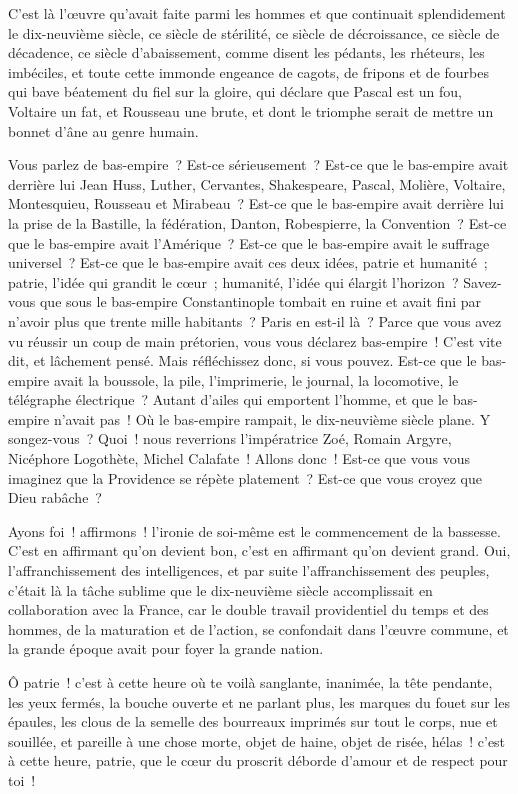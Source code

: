 \documentclass[french,twoside]{book} %
\begin{document}
C’est là l’œuvre qu’avait faite parmi les hommes et que continuait splendidement le dix-neuvième siècle, ce siècle de stérilité, ce siècle de décroissance, ce siècle de décadence, ce siècle d’abaissement, comme disent les pédants, les rhéteurs, les imbéciles, et toute cette immonde engeance de cagots, de fripons et de fourbes qui bave béatement du fiel sur la gloire, qui déclare que Pascal est un fou, Voltaire un fat, et Rousseau une brute, et dont le triomphe serait de mettre un bonnet d’âne au genre humain.\par
Vous parlez de bas-empire ? Est-ce sérieusement ? Est-ce que le bas-empire avait derrière lui Jean Huss, Luther, Cervantes, Shakespeare, Pascal, Molière, Voltaire, Montesquieu, Rousseau et Mirabeau ? Est-ce que le bas-empire avait derrière lui la prise de la Bastille, la fédération, Danton, Robespierre, la Convention ? Est-ce que le bas-empire avait l’Amérique ? Est-ce que le bas-empire avait le suffrage universel ? Est-ce que le bas-empire avait ces deux idées, patrie et humanité ; patrie, l’idée qui grandit le cœur ; humanité, l’idée qui élargit l’horizon ? Savez-vous que sous le bas-empire Constantinople tombait en ruine et avait fini par n’avoir plus que trente mille habitants ? Paris en est-il là ? Parce que vous avez vu réussir un coup de main prétorien, vous vous déclarez bas-empire ! C’est vite dit, et lâchement pensé. Mais réfléchissez donc, si vous pouvez. Est-ce que le bas-empire avait la boussole, la pile, l’imprimerie, le journal, la locomotive, le télégraphe électrique ? Autant d’ailes qui emportent l’homme, et que le bas-empire n’avait pas ! Où le bas-empire rampait, le dix-neuvième siècle plane. Y songez-vous ? Quoi ! nous reverrions l’impératrice Zoé, Romain Argyre, Nicéphore Logothète, Michel Calafate ! Allons donc ! Est-ce que vous vous imaginez que la Providence se répète platement ? Est-ce que vous croyez que Dieu rabâche ?\par
Ayons foi ! affirmons ! l’ironie de soi-même est le commencement de la bassesse. C’est en affirmant qu’on devient bon, c’est en affirmant qu’on devient grand. Oui, l’affranchissement des intelligences, et par suite l’affranchissement des peuples, c’était là la tâche sublime que le dix-neuvième siècle accomplissait en collaboration avec la France, car le double travail providentiel du temps et des hommes, de la maturation et de l’action, se confondait dans l’œuvre commune, et la grande époque avait pour foyer la grande nation.\par
Ô patrie ! c’est à cette heure où te voilà sanglante, inanimée, la tête pendante, les yeux fermés, la bouche ouverte et ne parlant plus, les marques du fouet sur les épaules, les clous de la semelle des bourreaux imprimés sur tout le corps, nue et souillée, et pareille à une chose morte, objet de haine, objet de risée, hélas ! c’est à cette heure, patrie, que le cœur du proscrit déborde d’amour et de respect pour toi !\par
\end{document}
